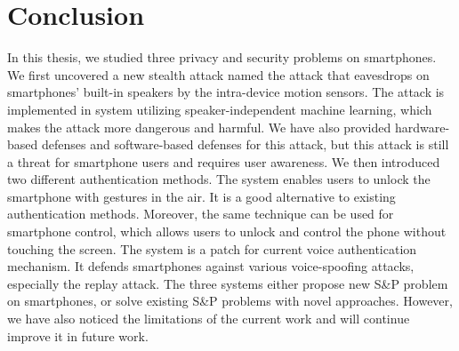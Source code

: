 \chapter{Conclusion}\label{chap:concl}
In this thesis, we studied three privacy and security problems on smartphones.
We first uncovered a new stealth attack named the {\attackName} attack that eavesdrops on smartphones' built-in speakers by the intra-device motion sensors. The attack is implemented in {\spp} system utilizing speaker-independent machine learning, which makes the attack more dangerous and harmful. We have also provided hardware-based defenses and software-based defenses for this attack, but this attack is still a threat for smartphone users and requires user awareness. We then introduced two different authentication methods. The {\uu} system enables users to unlock the smartphone with gestures in the air.  It is a good alternative to existing authentication methods. Moreover, the same technique can be used for smartphone control, which allows users to unlock and control the phone without touching the screen.  The {\mv} system is a patch for current voice authentication mechanism. It defends smartphones against various voice-spoofing attacks, especially the replay attack. The three systems either propose new S\&P problem on smartphones, or solve existing S\&P problems with novel approaches. However, we have also noticed the limitations of the current work and will continue improve it in future work.


%

